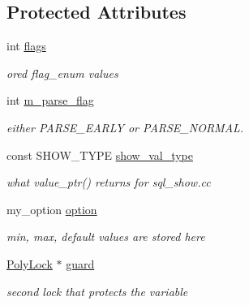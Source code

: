 \subsection*{Protected Attributes}
\begin{DoxyCompactItemize}
\item 
\mbox{\label{classsys__var_ab8847ce287d6d685e06049859ffa243c}} 
int \mbox{\hyperlink{classsys__var_ab8847ce287d6d685e06049859ffa243c}{flags}}
\begin{DoxyCompactList}\small\item\em or\textquotesingle{}ed flag\+\_\+enum values \end{DoxyCompactList}\item 
\mbox{\label{classsys__var_afad406566e686ebd6bd95014fd6fc744}} 
int \mbox{\hyperlink{classsys__var_afad406566e686ebd6bd95014fd6fc744}{m\+\_\+parse\+\_\+flag}}
\begin{DoxyCompactList}\small\item\em either P\+A\+R\+S\+E\+\_\+\+E\+A\+R\+LY or P\+A\+R\+S\+E\+\_\+\+N\+O\+R\+M\+AL. \end{DoxyCompactList}\item 
\mbox{\label{classsys__var_ab6628d06f7becbd0231835a3f440ee9f}} 
const S\+H\+O\+W\+\_\+\+T\+Y\+PE \mbox{\hyperlink{classsys__var_ab6628d06f7becbd0231835a3f440ee9f}{show\+\_\+val\+\_\+type}}
\begin{DoxyCompactList}\small\item\em what value\+\_\+ptr() returns for sql\+\_\+show.\+cc \end{DoxyCompactList}\item 
\mbox{\label{classsys__var_a0b1ff282ca0e7b88a2827d8afd363119}} 
my\+\_\+option \mbox{\hyperlink{classsys__var_a0b1ff282ca0e7b88a2827d8afd363119}{option}}
\begin{DoxyCompactList}\small\item\em min, max, default values are stored here \end{DoxyCompactList}\item 
\mbox{\label{classsys__var_adc43f92f49d7d311d9b90085a27b791a}} 
\mbox{\hyperlink{classPolyLock}{Poly\+Lock}} $\ast$ \mbox{\hyperlink{classsys__var_adc43f92f49d7d311d9b90085a27b791a}{guard}}
\begin{DoxyCompactList}\small\item\em {\itshape second} lock that protects the variable \end{DoxyCompactList}\item 

\end{DoxyCompactItemize}
